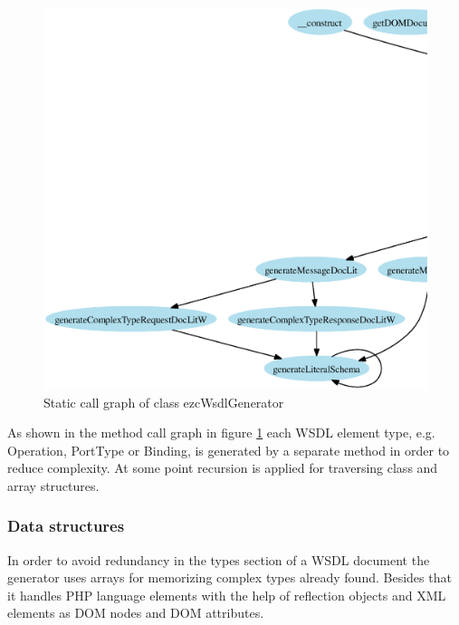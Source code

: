 \documentclass[10pt,final,a4paper,oneside]{article}
\begin{document}
\begin{figure}[htbp]
	\centering
		\includegraphics[width=1.00\textwidth]{figures/callgraph-Generators-class.WSDLGenerator.ps}
	\caption{Static call graph of class ezcWsdlGenerator}
	\label{fig:callgraph-Generators-class.WSDLGenerator}
\end{figure}

As shown in the method call graph
in figure \ref{fig:callgraph-Generators-class.WSDLGenerator}
each WSDL element type, e.g. Operation, PortType or Binding,
is generated by a separate method in order to reduce complexity.
At some point recursion is applied
for traversing class and array structures.


\subsubsection{Data structures}
In order to avoid redundancy in the types section of a WSDL document
the generator uses arrays for memorizing complex types already found.
Besides that it handles
PHP language elements with the help of reflection objects
and XML elements as DOM nodes and DOM attributes.
\end{document}
